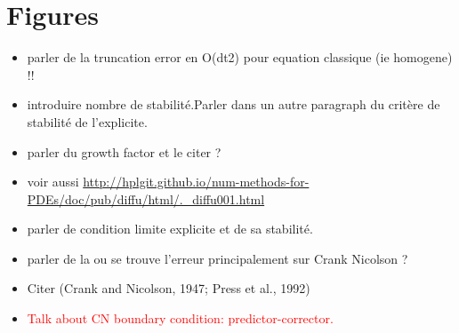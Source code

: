 \documentclass[]{interact}
\theoremstyle{plain}%
\theoremstyle{definition}
\theoremstyle{remark}
\begin{document}
\newpage
\section*{Figures}

\begin{itemize}
    \item parler de la truncation error en O(dt2) pour equation classique (ie homogene) !!
    \item introduire nombre de stabilité.Parler dans un autre paragraph du critère de stabilité de l'explicite.
    \item parler du growth factor et le citer ?
    \item voir aussi  \url{http://hplgit.github.io/num-methods-for-PDEs/doc/pub/diffu/html/._diffu001.html}
    \item parler de condition limite explicite et de sa stabilité.
    \item parler de la ou se trouve l'erreur principalement sur Crank Nicolson ?
    \item Citer (Crank and Nicolson, 1947; Press et al., 1992)
    \item  \textcolor{red}{Talk about CN boundary condition: predictor-corrector.}
\end{itemize}






\end{document}
